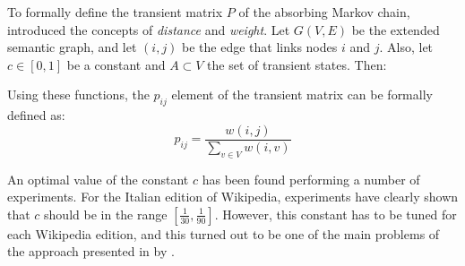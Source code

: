             To formally define the transient matrix \(P\) of the absorbing Markov chain, \citeauthor{Bonetti} introduced the concepts of \emph{distance} and \emph{weight}. Let \(G\left(V,E\right)\) be the extended semantic graph, and let \(\left(i,j\right)\) be the edge that links nodes \(i\) and \(j\). Also, let \(c \in \left[0,1\right]\) be a constant and \(A \subset V\) the set of transient states. Then:
            
            Using these functions, the \(p_{ij}\) element of the transient matrix can be formally defined as:
            \[p_{ij} = \frac{w\left(i,j\right)}{\sum_{v \in V}w\left(i,v\right)}\]
            
            An optimal value of the constant \(c\) has been found performing a number of experiments. For the Italian edition of Wikipedia, experiments have clearly shown that \(c\) should be in the range \(\left[\frac{1}{30},\frac{1}{90}\right]\). However, this constant has to be tuned for each Wikipedia edition, and this turned out to be one of the main problems of the approach presented in \cite{Bonetti} by \citeauthor{Bonetti}.